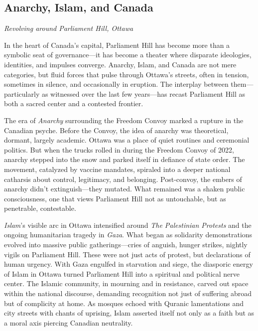 \documentclass[12pt]{article}
\begin{document}
\onehalfspacing
\begin{multicols}{2}

\section*{Anarchy, Islam, and Canada}
\noindent\textit{Revolving around Parliament Hill, Ottawa}

In the heart of Canada’s capital, Parliament Hill has become more than a symbolic seat of governance—it has become a theater where disparate ideologies, identities, and impulses converge. Anarchy, Islam, and Canada are not mere categories, but fluid forces that pulse through Ottawa’s streets, often in tension, sometimes in silence, and occasionally in eruption. The interplay between them—particularly as witnessed over the last few years—has recast Parliament Hill as both a sacred center and a contested frontier.

The era of \textit{Anarchy} surrounding the Freedom Convoy marked a rupture in the Canadian psyche. Before the Convoy, the idea of anarchy was theoretical, dormant, largely academic. Ottawa was a place of quiet routines and ceremonial politics. But when the trucks rolled in during the Freedom Convoy of 2022, anarchy stepped into the snow and parked itself in defiance of state order. The movement, catalyzed by vaccine mandates, spiraled into a deeper national catharsis about control, legitimacy, and belonging. Post-convoy, the embers of anarchy didn’t extinguish—they mutated. What remained was a shaken public consciousness, one that views Parliament Hill not as untouchable, but as penetrable, contestable.

\textit{Islam}’s visible arc in Ottawa intensified around \textit{The Palestinian Protests} and the ongoing humanitarian tragedy in \textit{Gaza}. What began as solidarity demonstrations evolved into massive public gatherings—cries of anguish, hunger strikes, nightly vigils on Parliament Hill. These were not just acts of protest, but declarations of human urgency. With Gaza engulfed in starvation and siege, the diasporic energy of Islam in Ottawa turned Parliament Hill into a spiritual and political nerve center. The Islamic community, in mourning and in resistance, carved out space within the national discourse, demanding recognition not just of suffering abroad but of complicity at home. As mosques echoed with Quranic lamentations and city streets with chants of uprising, Islam asserted itself not only as a faith but as a moral axis piercing Canadian neutrality.


\end{multicols}
\end{document}
